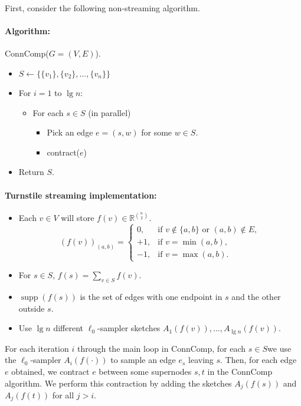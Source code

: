 \documentclass[11pt]{article}
\DeclareMathOperator{\supp}{supp}
\newcommand{\R}{\mathbb{R}}
\theoremstyle{definition}
\theoremstyle{remark}
\begin{document}
First, consider the following non-streaming algorithm.

\paragraph{Algorithm:} ConnComp($G=(V,E)$).
\begin{itemize}
\item $S\leftarrow\{\{v_1\},\{v_2\},\ldots,\{v_n\}\}$
\item For $i=1$ to $\lg n$:
	\begin{itemize}
	\item For each $s\in S$ (in parallel)
		\begin{itemize}
		\item Pick an edge $e=(s,w)$ for some $w\in S$.
		\item contract($e$)
		\end{itemize}
	\end{itemize}
\item Return $S$.
\end{itemize}

\paragraph{Turnstile streaming implementation:}
\begin{itemize}
\item Each $v\in V$ will store $f(v)\in\R^{\binom{n}{2}}$.
\[
(f(v))_{(a,b)}=
\begin{cases}
0, & \text{if }v\notin\{a,b\}\text{ or }(a,b)\notin E, \\
+1, & \text{if }v=\min(a,b), \\
-1, & \text{if }v=\max(a,b).
\end{cases}
\]
\item For $s\in S$, $f(s)=\sum\limits_{v\in S} f(v)$.
\item $\supp(f(s))$ is the set of edges with one endpoint in $s$ and the other outside $s$.
\item Use $\lg n$ different $\ell_0$-sampler sketches $A_1(f(v)),\ldots,A_{\lg n}(f(v))$.
\end{itemize}

For each iteration $i$ through the main loop in ConnComp, for each $s\in S$we use the $\ell_0$-sampler $A_i(f(\cdot))$ to sample an edge $e_s$ leaving $s$. Then, for each edge $e$ obtained, we contract $e$ between some supernodes $s, t$ in the ConnComp algorithm. We perform this contraction by adding the sketches $A_j(f(s))$ and $A_j(f(t))$ for all $j > i$.
\end{document}
